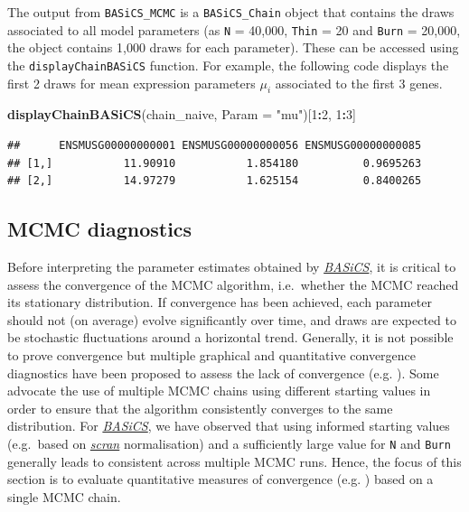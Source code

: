 \documentclass[9pt,a4paper,]{extarticle}
\newenvironment{Shaded}{\begin{snugshade}}{\end{snugshade}}
\newcommand{\DataTypeTok}[1]{\textcolor[rgb]{0.13,0.29,0.53}{#1}}
\newcommand{\DecValTok}[1]{\textcolor[rgb]{0.00,0.00,0.81}{#1}}
\newcommand{\KeywordTok}[1]{\textcolor[rgb]{0.13,0.29,0.53}{\textbf{#1}}}
\newcommand{\NormalTok}[1]{#1}
\newcommand{\OperatorTok}[1]{\textcolor[rgb]{0.81,0.36,0.00}{\textbf{#1}}}
\newcommand{\StringTok}[1]{\textcolor[rgb]{0.31,0.60,0.02}{#1}}
\begin{document}
The output from \texttt{BASiCS\_MCMC} is a \texttt{BASiCS\_Chain} object that contains the
draws associated to all model parameters (as \texttt{N} = 40,000, \texttt{Thin} = 20 and
\texttt{Burn} = 20,000, the object contains 1,000 draws for each parameter).
These can be accessed using the \texttt{displayChainBASiCS} function.
For example, the following code displays the first 2 draws for mean
expression parameters \(\mu_i\) associated to the first 3 genes.

\begin{Shaded}
\begin{Highlighting}[]
\KeywordTok{displayChainBASiCS}\NormalTok{(chain_naive, }\DataTypeTok{Param =} \StringTok{"mu"}\NormalTok{)[}\DecValTok{1}\OperatorTok{:}\DecValTok{2}\NormalTok{, }\DecValTok{1}\OperatorTok{:}\DecValTok{3}\NormalTok{]}
\end{Highlighting}
\end{Shaded}

\begin{verbatim}
##      ENSMUSG00000000001 ENSMUSG00000000056 ENSMUSG00000000085
## [1,]           11.90910           1.854180          0.9695263
## [2,]           14.97279           1.625154          0.8400265
\end{verbatim}

\hypertarget{mcmc-diagnostics}{%
\subsection{MCMC diagnostics}\label{mcmc-diagnostics}}

Before interpreting the parameter estimates obtained by \emph{\href{https://bioconductor.org/packages/3.11/BASiCS}{BASiCS}},
it is critical to assess the convergence of the MCMC algorithm, i.e.~whether
the MCMC reached its stationary distribution.
If convergence has been achieved, each parameter should not (on average) evolve
significantly over time, and draws are expected to be stochastic fluctuations
around a horizontal trend.
Generally, it is not possible to prove convergence but multiple graphical and
quantitative convergence diagnostics have been proposed to assess the lack
of convergence (e.g. \citep{CowlesCarlin1996, BrooksGelman1998}).
Some advocate the use of multiple MCMC chains using different starting values in
order to ensure that the algorithm consistently converges to the same
distribution.
For \emph{\href{https://bioconductor.org/packages/3.11/BASiCS}{BASiCS}}, we have observed that using informed starting values
(e.g.~based on \emph{\href{https://bioconductor.org/packages/3.11/scran}{scran}} normalisation) and a sufficiently large
value for \texttt{N} and \texttt{Burn} generally leads to consistent across multiple MCMC runs.
Hence, the focus of this section is to evaluate quantitative measures of
convergence (e.g. \citep{Geweke1995}) based on a single MCMC chain.
\end{document}
